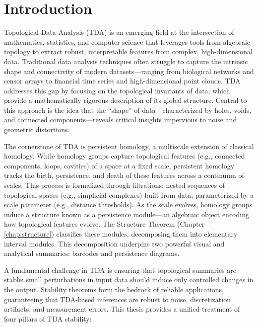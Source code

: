 \chapter*{Introduction}

Topological Data Analysis (TDA) is an emerging field at the intersection of mathematics, statistics, and computer science that leverages tools from algebraic topology to extract robust, interpretable features from complex, high-dimensional data. Traditional data analysis techniques often struggle to capture the intrinsic shape and connectivity of modern datasets—ranging from biological networks and sensor arrays to financial time series and high-dimensional point clouds. TDA addresses this gap by focusing on the topological invariants of data, which provide a mathematically rigorous description of its global structure. Central to this approach is the idea that the ``shape'' of data—characterized by holes, voids, and connected components—reveals critical insights impervious to noise and geometric distortions.

The cornerstone of TDA is persistent homology, a multiscale extension of classical homology. While homology groups capture topological features (e.g., connected components, loops, cavities) of a space at a fixed scale, persistent homology tracks the birth, persistence, and death of these features across a continuum of scales. This process is formalized through filtrations: nested sequences of topological spaces (e.g., simplicial complexes) built from data, parameterized by a scale parameter (e.g., distance thresholds). As the scale evolves, homology groups induce a structure known as a persistence module—an algebraic object encoding how topological features evolve. The Structure Theorem (Chapter \ref{chap:structure}) classifies these modules, decomposing them into elementary interval modules. This decomposition underpins two powerful visual and analytical summaries: barcodes and persistence diagrams.

A fundamental challenge in TDA is ensuring that topological summaries are stable: small perturbations in input data should induce only controlled changes in the output. Stability theorems form the bedrock of reliable applications, guaranteeing that TDA-based inferences are robust to noise, discretization artifacts, and measurement errors. This thesis provides a unified treatment of four pillars of TDA stability:

